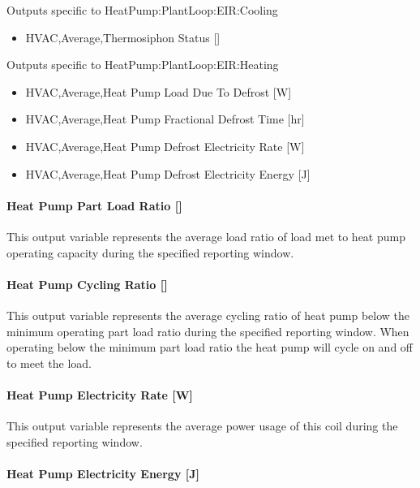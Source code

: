 Outputs specific to HeatPump:PlantLoop:EIR:Cooling

\begin{itemize}
    \item
    HVAC,Average,Thermosiphon Status  {[}{]}
\end{itemize}

Outputs specific to HeatPump:PlantLoop:EIR:Heating

\begin{itemize}
    \item
    HVAC,Average,Heat Pump Load Due To Defrost  {[}W{]}
    \item
    HVAC,Average,Heat Pump Fractional Defrost Time  {[}hr{]}
    \item
    HVAC,Average,Heat Pump Defrost Electricity Rate  {[}W{]}
    \item
    HVAC,Average,Heat Pump Defrost Electricity Energy  {[}J{]}
\end{itemize}


\paragraph{Heat Pump Part Load Ratio {[}{]}}\label{plhp_eir_outputs_part_load_ratio}

This output variable represents the average load ratio of load met to heat pump operating capacity during the specified reporting window.

\paragraph{Heat Pump Cycling Ratio {[}{]}}\label{plhp_eir_outputs_cycling_ratio}

This output variable represents the average cycling ratio of heat pump below the minimum operating part load ratio during the specified reporting window. When operating below the minimum part load ratio the heat pump will cycle on and off to meet the load.

\paragraph{Heat Pump Electricity Rate {[}W{]}}\label{plhp_eir_outputs_power_usage}

This output variable represents the average power usage of this coil during the specified reporting window.

\paragraph{Heat Pump Electricity Energy {[}J{]}}\label{plhp_eir_outputs_energy_usage}

